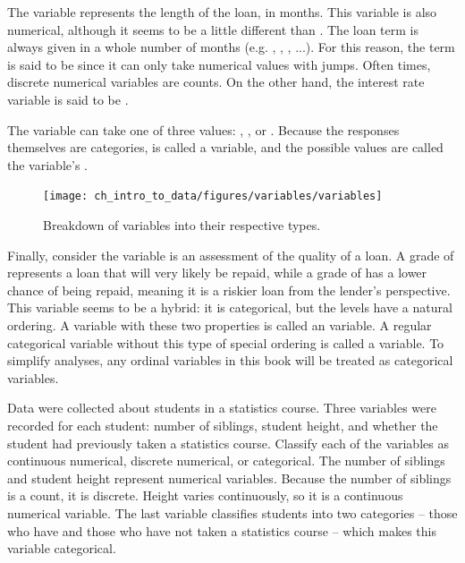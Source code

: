 The  variable represents the length of the loan,
in months.
This variable is also numerical,
although it seems to be a little different than
.
The loan term is always given in a whole number of months
(e.g. , , , ...).
For this reason, the term is said to be 
since it can only take numerical values with jumps.
Often times, discrete numerical variables are counts.
On the other hand, the interest rate variable is said to
be .

The variable  can take
one of three values: , , or .
Because the responses themselves are categories,
 is called
a  variable,
and the possible values are called the variable's .

\begin{figure}
\centering
\texttt{[image: ch\_intro\_to\_data/figures/variables/variables]}
\caption{Breakdown of variables into their respective types.}
\label{variables}
\end{figure}

Finally, consider the  variable is an assessment
of the quality of a loan. A grade of  represents
a loan that will very likely be repaid, while a grade of
 has a lower chance of being repaid, meaning it is
a riskier loan from the lender's perspective.
This variable seems to be a hybrid:
it is categorical, but the levels have a natural ordering.
A variable with these two properties is called an
 variable.
A regular categorical variable without this type of special
ordering is called a  variable.
To simplify analyses, any ordinal variables in this book
will be treated as categorical variables.

\begin{example}{Data were collected about students in a statistics course. Three variables were recorded for each student: number of siblings, student height, and whether the student had previously taken a statistics course. Classify each of the variables as continuous numerical, discrete numerical, or categorical.}
The number of siblings and student height represent numerical variables. Because the number of siblings is a count, it is discrete. Height varies continuously, so it is a continuous numerical variable. The last variable classifies students into two categories -- those who have and those who have not taken a statistics course -- which makes this variable categorical.
\end{example}

